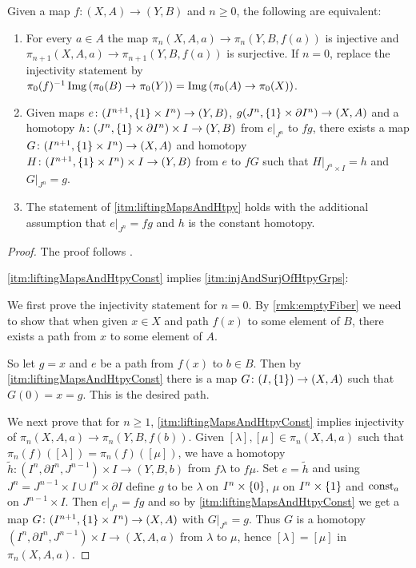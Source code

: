 \begin{prop}\label{prop:eqCharInjSurj}
    Given a map $f\colon(X,A)\to (Y,B)$ and $n\geq0$, the following are equivalent:
    \begin{enumerate}[label={(\roman*)}]
        \item For every $a\in A$ the map $\pi_n(X,A,a)\to \pi_n(Y,B,f(a))$ is injective and $\pi_{n+1}(X,A,a)\to \pi_{n+1}(Y,B,f(a))$ is surjective.
            If $n=0$, replace the injectivity statement by $\pi_0(f)^{-1}\operatorname{Img}\left(\pi_0(B)\to\pi_0(Y)\right)=\operatorname{Img}\left(\pi_0(A)\to\pi_0(X)\right)$. \label{itm:injAndSurjOfHtpyGrps}
        \item Given maps $e\colon(I^{n+1},\left\lbrace1\right\rbrace\times I^n)\to (Y,B)$, $g(J^n,\left\lbrace1\right\rbrace\times\partial I^n)\to(X,A)$ and a homotopy $h\colon(J^n,\left\lbrace1\right\rbrace\times\partial I^n)\times I\to(Y,B)$ from $e|_{J^n}$ to $fg$, there exists a map $G\colon(I^{n+1},\left\lbrace1\right\rbrace\times I^n)\to(X,A)$ and homotopy $H\colon(I^{n+1},\left\lbrace1\right\rbrace\times I^n)\times I\to(Y,B)$ from $e$ to $fG$ such that $H|_{J^n\times I}=h$ and $G|_{J^n}=g$. \label{itm:liftingMapsAndHtpy}
        \item The statement of \ref{itm:liftingMapsAndHtpy} holds with the additional assumption that $e|_{J^n}=fg$ and $h$ is the constant homotopy. \label{itm:liftingMapsAndHtpyConst}
    \end{enumerate}
    \begin{proof}
        The proof follows \cite[Lemma 3.3]{may1990weak}.

        \ref{itm:liftingMapsAndHtpyConst} implies \ref{itm:injAndSurjOfHtpyGrps}:

        We first prove the injectivity statement for $n=0$. 
        By \cref{rmk:emptyFiber} we need to show that when given $x\in X$ and path $f(x)$ to some element of $B$, there exists a path from $x$ to some element of $A$.

        So let $g=x$ and $e$ be a path from $f(x)$ to $b\in B$.
        Then by \ref{itm:liftingMapsAndHtpyConst} there is a map $G\colon (I,\left\lbrace1\right\rbrace)\to(X,A)$ such that $G(0)=x=g$.
        This is the desired path.

        We next prove that for $n\geq 1$, \ref{itm:liftingMapsAndHtpyConst} implies injectivity of $\pi_n(X,A,a)\to \pi_n(Y,B,f(b))$.
        Given $[\lambda],[\mu]\in\pi_n(X,A,a)$ such that $\pi_n(f)([\lambda])=\pi_n(f)([\mu])$, we have a homotopy $\widetilde{h}\colon(I^n,\partial I^n,J^{n-1})\times I\to (Y,B,b)$ from $f\lambda$ to $f\mu$.
        Set $e=\widetilde{h}$ and using $J^n=J^{n-1}\times I\cup I^n\times\partial I$ define $g$ to be $\lambda$ on $I^n\times\left\lbrace0\right\rbrace$, $\mu$ on $I^n\times\left\lbrace1\right\rbrace$ and $\operatorname{const}_a$ on $J^{n-1}\times I$.
        Then $e|_{J^n}=fg$ and so by \ref{itm:liftingMapsAndHtpyConst} we get a map $G\colon(I^{n+1},\left\lbrace1\right\rbrace\times I^n)\to(X,A)$ with $G|_{J^n}=g$. 
        Thus $G$ is a homotopy $(I^n,\partial I^n,J^{n-1})\times I\to(X,A,a)$ from $\lambda$ to $\mu$, hence $[\lambda]=[\mu]$ in $\pi_n(X,A,a)$.


\end{proof}
\end{prop}
